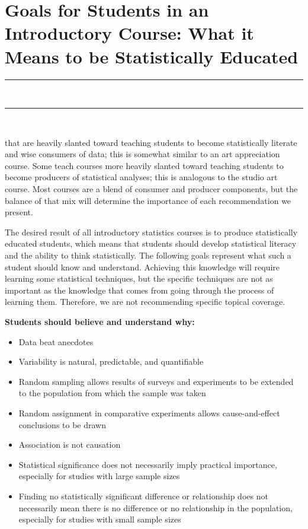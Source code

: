 \chapter{Goals for Students in an Introductory Course: What it Means to be Statistically Educated}
\vspace{-.53in}
   \noindent\color{graylight}\rule[0cm]{3.25in}{0.03cm} \\
    \noindent\color{graylight}\rule[0.4cm]{3.25in}{0.03cm} \\
\color{black}
\vspace{.05in}

 that are heavily slanted toward teaching students to become statistically literate and wise consumers of data; this is somewhat similar to an art appreciation course. Some teach courses more heavily slanted toward teaching students to become producers of statistical analyses; this is analogous to the studio art course. Most courses are a blend of consumer and producer components, but the balance of that mix will determine the importance of each recommendation we present.   

The desired result of all introductory statistics courses is to produce statistically educated students, which means that students should develop statistical literacy and the ability to think statistically. The following goals represent what such a student should know and understand. Achieving this knowledge will require learning some statistical techniques, but the specific techniques are not as important as the knowledge that comes from going through the process of learning them. Therefore, we are not recommending specific topical coverage.\\
\vspace{12pt}

\noindent\textbf{Students should believe and understand why:}

\begin{itemize}[leftmargin=1cm, itemsep=.2em]
\renewcommand\labelitemi{$\closedsucc$}
\item Data beat anecdotes
\item Variability is natural, predictable, and quantifiable
\item Random sampling allows results of surveys and experiments to be extended to the population from which the sample was taken
\item Random assignment in comparative experiments allows cause-and-effect conclusions to be drawn
\item Association is not causation
\item Statistical significance does not necessarily imply practical importance, especially for studies with large sample sizes
\item Finding no statistically significant difference or relationship does not necessarily mean there is no difference or no relationship in the population, especially for studies with small sample sizes
\end{itemize}

